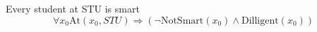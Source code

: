 \documentclass{article}
\begin{document}
Every student at STU is smart
$$
\forall
x_0
\text{
At
}
(
x_0
, 
STU
)
\Rightarrow
(
\neg 
\text{
NotSmart
}
(
x_0
)
\wedge
\text{
Dilligent
}
(
x_0
)
)
$$
\end{document}
